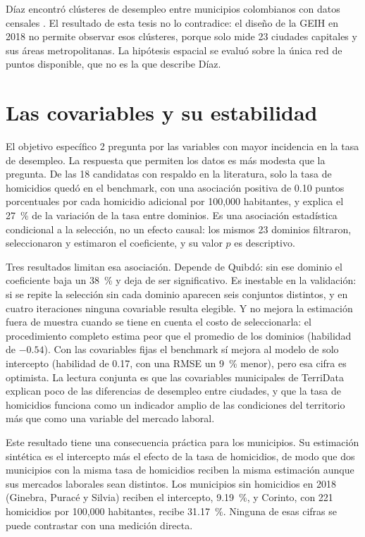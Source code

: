 Díaz encontró clústeres de desempleo entre municipios colombianos con datos censales \cite[pp.~123--124]{Diaz2016}. El resultado de esta tesis no lo contradice: el diseño de la GEIH en 2018 no permite observar esos clústeres, porque solo mide 23 ciudades capitales y sus áreas metropolitanas. La hipótesis espacial se evaluó sobre la única red de puntos disponible, que no es la que describe Díaz.

\section{Las covariables y su estabilidad}
\label{sec:dis_covariables}

El objetivo específico 2 pregunta por las variables con mayor incidencia en la tasa de desempleo. La respuesta que permiten los datos es más modesta que la pregunta. De las 18 candidatas con respaldo en la literatura, solo la tasa de homicidios quedó en el benchmark, con una asociación positiva de 0.10 puntos porcentuales por cada homicidio adicional por 100,000 habitantes, y explica el 27~\% de la variación de la tasa entre dominios. Es una asociación estadística condicional a la selección, no un efecto causal: los mismos 23 dominios filtraron, seleccionaron y estimaron el coeficiente, y su valor $p$ es descriptivo.

Tres resultados limitan esa asociación. Depende de Quibdó: sin ese dominio el coeficiente baja un 38~\% y deja de ser significativo. Es inestable en la validación: si se repite la selección sin cada dominio aparecen seis conjuntos distintos, y en cuatro iteraciones ninguna covariable resulta elegible. Y no mejora la estimación fuera de muestra cuando se tiene en cuenta el costo de seleccionarla: el procedimiento completo estima peor que el promedio de los dominios (habilidad de $-0.54$). Con las covariables fijas el benchmark sí mejora al modelo de solo intercepto (habilidad de 0.17, con una RMSE un 9~\% menor), pero esa cifra es optimista. La lectura conjunta es que las covariables municipales de TerriData explican poco de las diferencias de desempleo entre ciudades, y que la tasa de homicidios funciona como un indicador amplio de las condiciones del territorio más que como una variable del mercado laboral.

Este resultado tiene una consecuencia práctica para los municipios. Su estimación sintética es el intercepto más el efecto de la tasa de homicidios, de modo que dos municipios con la misma tasa de homicidios reciben la misma estimación aunque sus mercados laborales sean distintos. Los municipios sin homicidios en 2018 (Ginebra, Puracé y Silvia) reciben el intercepto, 9.19~\%, y Corinto, con 221 homicidios por 100,000 habitantes, recibe 31.17~\%. Ninguna de esas cifras se puede contrastar con una medición directa.

